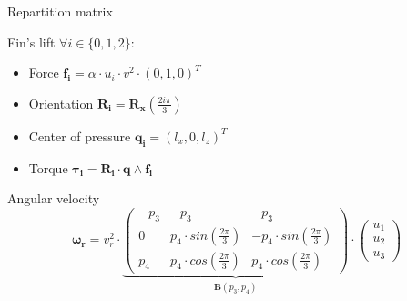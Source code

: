\documentclass[10pt, xcolor={usenames, dvipsnames}]{beamer}
\begin{document}
        \begin{frame}{Repartition matrix}
            \centering
            \begin{minipage}{0.8\textwidth}
                \begin{block}{Fin's lift}
                    $\forall i \in \{0, 1, 2\}:$
                    \begin{itemize}
                        \item Force $\mathbf{f_i} = \alpha \cdot u_i \cdot v^2 \cdot (0, 1, 0)^T$
                        \item Orientation $\mathbf{R_i} = \mathbf{R_x}\left(\frac{2i\pi}{3}\right)$
                        \item Center of pressure $\mathbf{q_i} = (\mathit{l_x}, 0, \mathit{l_z})^T$
                        \item Torque $\mathbf{\tau_i} = \mathbf{R_i} \cdot \mathbf{q} \wedge \mathbf{f_i}$
                    \end{itemize}
                \end{block}
                \begin{block}{Angular velocity}
                    \begin{equation}
                        \mathbf{\omega_r} = v_r^2 \cdot 
                            \underbrace{
                                \left(
                                \begin{smallmatrix}
                                    -p_3 & -p_3 & -p_3 \\
                                    0 & p_4 \cdot sin(\frac{2\pi}{3}) & -p_4 \cdot sin(\frac{2\pi}{3}) \\
                                    p_4 & p_4 \cdot cos(\frac{2\pi}{3}) & p_4 \cdot cos(\frac{2\pi}{3})
                                \end{smallmatrix}
                                \right)
                            }_{\mathbf{B}(p_3, p_4)} \cdot \left(\begin{smallmatrix}u_1\\ u_2\\ u_3\end{smallmatrix}\right)
                    \end{equation}
                \end{block}
            \end{minipage}
        \end{frame}
    
\end{document}
